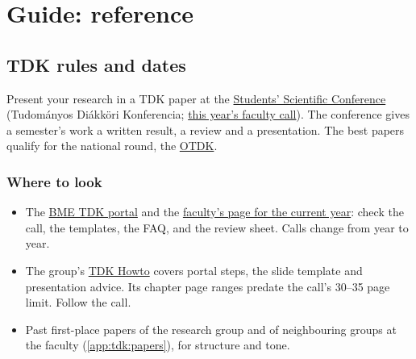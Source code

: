 \part*{Guide: reference}
\chapter{TDK rules and dates}\label{app:tdk}
Present your research in a TDK paper at the \href{https://tdk.bme.hu/}{Students' Scientific Conference} (Tudományos Diákköri Konferencia; \href{https://tdk.bme.hu/conference/VIK/2026}{this year's faculty call}). The conference gives a semester's work a written result, a review and a presentation. The best papers qualify for the national round, the \href{https://otdk.hu/}{OTDK}.

\section{Where to look}
\begin{itemize}
  \item The \href{https://tdk.bme.hu/}{BME TDK portal} and the \href{https://tdk.bme.hu/conference/VIK/2026}{faculty's page for the current year}: check the call, the templates, the FAQ, and the review sheet. Calls change from year to year.
  \item The group's \href{https://github.com/ftsrg/cheat-sheets/wiki/TDK-Howto}{TDK Howto} covers portal steps, the slide template and presentation advice. Its chapter page ranges predate the call's 30--35 page limit. Follow the call.
  \item Past first-place papers of the research group and of neighbouring groups at the faculty (\cref{app:tdk:papers}), for structure and tone.
\end{itemize}

